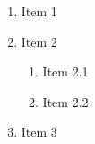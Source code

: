 \begin{enumerate}
    \item Item 1
    \item Item 2
    \begin{enumerate}
        \item Item 2.1
        \item Item 2.2
    \end{enumerate}
    \item Item 3
\end{enumerate}